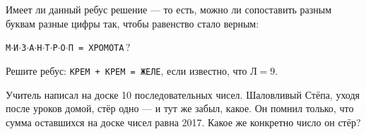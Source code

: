 ﻿
\begin{itemize}

\itA Имеет ли данный ребус решение --- то есть, можно ли сопоставить разным буквам разные цифры так, чтобы равенство стало верным:

\centerline{\texttt{М$\cdot$И$\cdot$З$\cdot$А$\cdot$Н$\cdot$Т$\cdot$Р$\cdot$О$\cdot$П  = 
ХРОМОТА}\,?}

\itB Решите ребус: {\texttt{КРЕМ + КРЕМ = ЖЕЛЕ}}, если известно, что $\text{Л}=9$.

\itC Учитель написал на доске 10 последовательных чисел. Шаловливый Стёпа, уходя после уроков домой, стёр одно — и тут же забыл, какое. Он помнил только, что сумма оставшихся на доске чисел равна 2017. Какое же конкретно число он стёр?
\end{itemize}